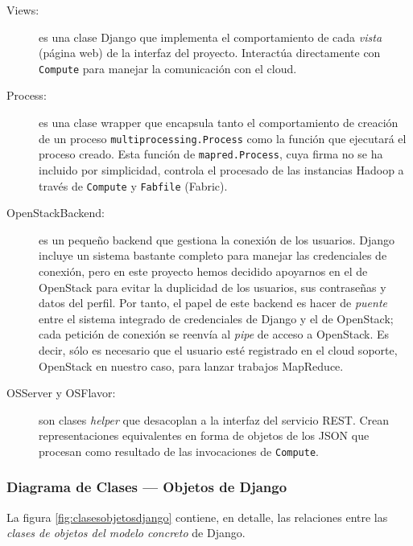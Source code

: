 \begin{description}
 \item[Views:] es una clase Django que implementa el comportamiento de cada \emph{vista} (p\'agina web) de la interfaz del proyecto. Interact\'ua directamente con \texttt{Compute} para manejar la comunicaci\'on con el cloud.
 \item[Process:] es una clase wrapper que encapsula tanto el comportamiento de creaci\'on de un proceso \texttt{multiprocessing.Process} como la funci\'on que ejecutar\'a el proceso creado. Esta funci\'on de \texttt{mapred.Process}, cuya firma no se ha incluido por simplicidad, controla el procesado de las instancias Hadoop a trav\'es de \texttt{Compute} y \texttt{Fabfile} (Fabric).
 \item[OpenStackBackend:] es un peque\~no backend que gestiona la conexi\'on de los usuarios. Django incluye un sistema bastante completo para manejar las credenciales de conexi\'on, pero en este proyecto hemos decidido apoyarnos en el de OpenStack para evitar la duplicidad de los usuarios, sus contrase\~nas y datos del perfil. Por tanto, el papel de este backend es hacer de \emph{puente} entre el sistema integrado de credenciales de Django y el de OpenStack; cada petici\'on de conexi\'on se reenv\'ia al \emph{pipe} de acceso a OpenStack. Es decir, s\'olo es necesario que el usuario est\'e registrado en el cloud soporte, OpenStack en nuestro caso, para lanzar trabajos MapReduce.
 \item[OSServer y OSFlavor:] son clases \emph{helper} que desacoplan a la interfaz del servicio REST. Crean representaciones equivalentes en forma de objetos de los JSON que procesan como resultado de las invocaciones de \texttt{Compute}.
\end{description}



\subsubsection{Diagrama de Clases --- Objetos de Django}\label{subsubsec:clasesobjetosdjango}
\noindent La figura \ref{fig:clasesobjetosdjango} contiene, en detalle, las relaciones entre las \emph{clases de objetos del modelo concreto} de Django.


